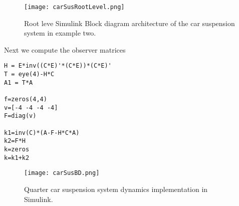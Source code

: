 \documentclass{amsart}
\theoremstyle{definition}
\theoremstyle{remark}
\numberwithin{equation}{section}
\begin{document}
\begin{figure}[H]
    \centering
    \texttt{[image: carSusRootLevel.png]}
    \caption{Root leve Simulink Block diagram architecture of the car suspension system in example two.}
    \label{fig:car_sus_fbd}
\end{figure}
Next we compute the observer matrices

\begin{verbatim}
H = E*inv((C*E)'*(C*E))*(C*E)'
T = eye(4)-H*C
A1 = T*A

f=zeros(4,4)
v=[-4 -4 -4 -4]
F=diag(v)

k1=inv(C)*(A-F-H*C*A)
k2=F*H
k=zeros
k=k1+k2
\end{verbatim}

\begin{figure}[H]
    \centering
    \texttt{[image: carSusBD.png]}
    \caption{Quarter car suspension system dynamics implementation in Simulink.}
    \label{fig:carSusBD}
\end{figure}
\end{document}
